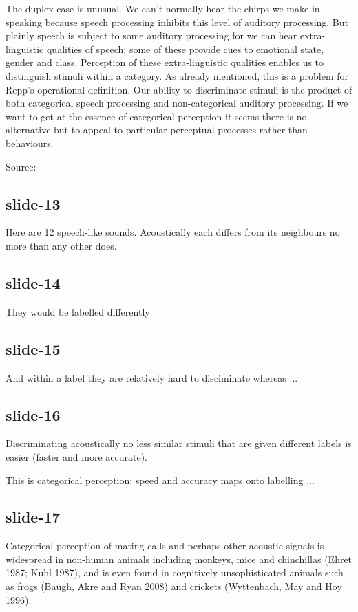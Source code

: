\documentclass[12pt,\papersize]{extarticle}
\begin{document}
The duplex case is unusual. We can’t normally hear the chirps we make in speaking because speech
processing inhibits this level of auditory processing. But plainly speech is subject to some auditory
processing for we can hear extra-linguistic qualities of speech; some of these provide cues to
emotional state, gender and class. Perception of these extra-linguistic qualities enables us to
distinguish stimuli within a category. As already mentioned, this is a problem for Repp’s operational
definition. Our ability to discriminate stimuli is the product of both categorical speech processing
and non-categorical auditory processing. If we want to get at the essence of categorical perception
it seems there is no alternative but to appeal to particular perceptual processes rather than
behaviours.

Source: \citep{Liberman:1981xk}

\subsection{slide-13}
Here are 12 speech-like sounds.
Acoustically each differs from its neighbours no more than any other does.

\subsection{slide-14}
They would be labelled differently

\subsection{slide-15}
And within a label they are relatively hard to disciminate whereas ...

\subsection{slide-16}
Discriminating acoustically no less similar stimuli that are given
different labels is easier (faster and more accurate).

This is categorical perception: speed and accuracy maps onto labelling ...

\subsection{slide-17}
Categorical perception of mating calls and perhaps other acoustic signals is widespread in non-human
animals including monkeys, mice and chinchillas (Ehret 1987; Kuhl 1987), and is even found in
cognitively unsophisticated animals such as frogs (Baugh, Akre and Ryan 2008) and crickets
(Wyttenbach, May and Hoy 1996).
\end{document}
